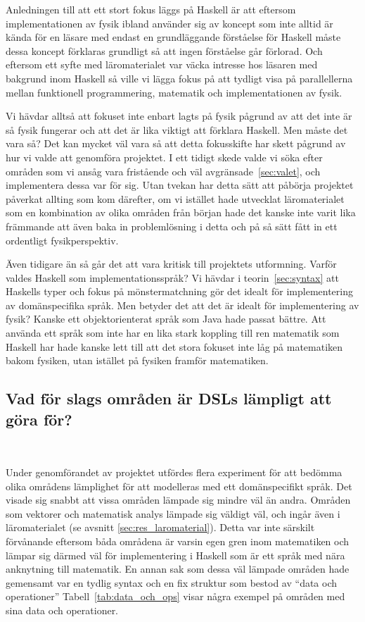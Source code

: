\begin{draft}
Anledningen till att ett stort fokus läggs på Haskell är att eftersom
implementationen av fysik ibland använder sig av koncept som inte alltid är
kända för en läsare med endast en grundläggande förståelse för Haskell måste
dessa koncept förklaras grundligt så att ingen förståelse går förlorad. Och
eftersom ett syfte med läromaterialet var väcka intresse hos läsaren med
bakgrund inom Haskell så ville vi lägga fokus på att tydligt visa på
parallellerna mellan funktionell programmering, matematik och implementationen
av fysik. 

Vi hävdar alltså att fokuset inte enbart lagts på fysik pågrund av att det inte
är så fysik fungerar och att det är lika viktigt att förklara Haskell. Men måste
det vara så? Det kan mycket väl vara så att detta fokusskifte har skett pågrund
av hur vi valde att genomföra projektet. I ett tidigt skede valde vi söka efter
områden som vi ansåg vara fristående och väl avgränsade~\ref{sec:valet},
och implementera dessa var för sig. Utan tvekan har detta sätt att påbörja
projektet påverkat allting som kom därefter, om vi istället hade utvecklat
läromaterialet som en kombination av olika områden från början hade det kanske
inte varit lika främmande att även baka in problemlösning i detta och på så sätt
fått in ett ordentligt fysikperspektiv. 

Även tidigare än så går det att vara kritisk till projektets utformning. Varför
valdes Haskell som implementationsspråk? Vi hävdar i teorin~\ref{sec:syntax} att
Haskells typer och fokus på mönstermatchning gör det idealt för implementering
av domänspecifika språk.  Men betyder det att det är idealt för implementering
av fysik? Kanske ett objektorienterat språk som Java hade passat bättre. Att
använda ett språk som inte har en lika stark koppling till ren matematik som
Haskell har hade kanske lett till att det stora fokuset inte låg på matematiken
bakom fysiken, utan istället på fysiken framför matematiken.

\subsection{Vad för slags områden är DSLs lämpligt att göra
för?}~\label{sec:lampligt}

Under genomförandet av projektet utfördes flera experiment för att bedömma olika
områdens lämplighet för att modelleras med ett domänspecifikt språk. Det visade
sig snabbt att vissa områden lämpade sig mindre väl än andra. Områden
som vektorer och matematisk analys lämpade sig väldigt väl, och ingår även i läromaterialet (se avsnitt \ref{sec:res_laromaterial}). Detta var inte
särskilt förvånande eftersom båda områdena är varsin egen gren inom matematiken
och lämpar sig därmed väl för implementering i Haskell som är ett språk med nära
anknytning till matematik. En annan sak som dessa väl lämpade områden hade
gemensamt var en tydlig syntax och en fix struktur som bestod av ``data och
operationer'' Tabell~\ref{tab:data_och_ops} visar några exempel på områden med
sina data och operationer.


\end{draft}
